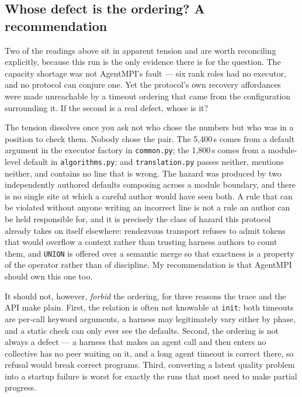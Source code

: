 \documentclass[11pt]{article}
\begin{document}
\subsection{Whose defect is the ordering? A recommendation}
\label{sec:whose}

Two of the readings above sit in apparent tension and are worth reconciling explicitly,
because this run is the only evidence there is for the question. The capacity shortage was
not AgentMPI's fault --- six rank roles had no executor, and no protocol can conjure one.
Yet the protocol's own recovery affordances were made unreachable by a timeout ordering
that came from the configuration surrounding it. If the second is a real defect, whose is
it?

The tension dissolves once you ask not who chose the numbers but who was in a position to
check them. Nobody chose the pair. The 5{,}400\,s comes from a default argument in the executor
factory in \texttt{common.py}; the 1{,}800\,s comes from a module-level default
in \texttt{algorithms.py}; and \texttt{translation.py} passes neither, mentions neither,
and contains no line that is wrong. The hazard was produced by two independently authored
defaults composing across a module boundary, and there is no single site at which a
careful author would have seen both. A rule that can be violated without anyone writing an
incorrect line is not a rule an author can be held responsible for, and it is precisely
the class of hazard this protocol already takes on itself elsewhere: rendezvous transport
refuses to admit tokens that would overflow a context rather than trusting harness authors
to count them, and \texttt{UNION} is offered over a semantic merge so that exactness is a
property of the operator rather than of discipline. My recommendation is that AgentMPI
should own this one too.

It should not, however, \emph{forbid} the ordering, for three reasons the trace and the
API make plain. First, the relation is often not knowable at \texttt{init}: both timeouts
are per-call keyword arguments, a harness may legitimately vary either by phase, and a
static check can only ever see the defaults. Second, the ordering is not always a defect
--- a harness that makes an agent call and then enters no collective has no peer waiting
on it, and a long agent timeout is correct there, so refusal would break correct programs.
Third, converting a latent quality problem into a startup failure is worst for exactly the
runs that most need to make partial progress.
\end{document}
